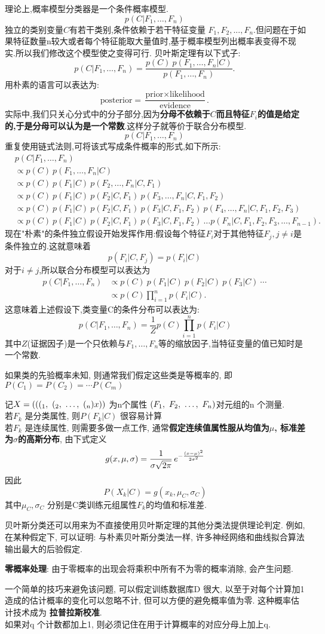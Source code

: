 \documentclass{article}
\begin{document}
理论上,概率模型分类器是一个条件概率模型.
$$ p(C \vert F_1,\dots,F_n)\, $$
独立的类别变量$C$有若干类别,条件依赖于若干特征变量 $F_1,F_2,...,F_n$.但问题在于如果特征数量n较大或者每个特征能取大量值时,基于概率模型列出概率表变得不现实.所以我们修改这个模型使之变得可行. 贝叶斯定理有以下式子:
$$ p(C \vert F_1,\dots,F_n) = \frac{p(C) \ p(F_1,\dots,F_n\vert C)}{p(F_1,\dots,F_n)}. \, $$
用朴素的语言可以表达为:
$$ \mbox{posterior} = \frac{\mbox{prior} \times \mbox{likelihood}}{\mbox{evidence}}.  \, $$
实际中,我们只关心分式中的分子部分,因为\textbf{分母不依赖于$C$而且特征$F_i$的值是给定的,于是分母可以认为是一个常数}.这样分子就等价于联合分布模型.
$$ p(C \vert F_1, \dots, F_n)\, $$
重复使用链式法则,可将该式写成条件概率的形式,如下所示:
$$
\begin{aligned}
& p(C \vert F_1, \dots, F_n)\,\\
& \varpropto p(C) \ p(F_1,\dots,F_n\vert C)\\
& \varpropto p(C) \ p(F_1\vert C) \ p(F_2,\dots,F_n\vert C, F_1)\\
& \varpropto p(C) \ p(F_1\vert C) \ p(F_2\vert C, F_1) \ p(F_3,\dots,F_n\vert C, F_1, F_2)\\
& \varpropto p(C) \ p(F_1\vert C) \ p(F_2\vert C, F_1) \ p(F_3\vert C, F_1, F_2) \ p(F_4,\dots,F_n\vert C, F_1, F_2, F_3)\\
& \varpropto p(C) \ p(F_1\vert C) \ p(F_2\vert C, F_1) \ p(F_3\vert C, F_1, F_2) \ \dots p(F_n\vert C, F_1, F_2, F_3,\dots,F_{n-1}).
\end{aligned}
$$
现在"朴素"的条件独立假设开始发挥作用:假设每个特征$F_i$对于其他特征$F_j,j\neq i$是条件独立的.这就意味着
$$ p(F_i \vert C, F_j) = p(F_i \vert C)\, $$
对于$i\ne j$,所以联合分布模型可以表达为
$$
\begin{aligned}
p(C \vert F_1, \dots, F_n) 
& \varpropto p(C) \ p(F_1\vert C) \ p(F_2\vert C) \ p(F_3\vert C) \ \cdots\, \\
& \varpropto p(C) \prod_{i=1}^n p(F_i \vert C).\,
\end{aligned}
$$
这意味着上述假设下,类变量C的条件分布可以表达为:
$$ p(C \vert F_1,\dots,F_n) = \frac{1}{Z}  p(C) \prod_{i=1}^n p(F_i \vert C) $$
其中$Z$(证据因子)是一个只依赖与$F_1,\dots,F_n$等的缩放因子,当特征变量的值已知时是一个常数.

如果类的先验概率未知, 则通常我们假定这些类是等概率的, 即
$ P(C_1)= P(C_2)= \cdots P(C_m) $

记$X = (((_1,~(_2,~\ldots,~(_n)x))$ 为n个属性 $(F_1,~F_2,~\ldots,~F_n)$对元组的n 个测量.\\
若$F_k$ 是分类属性, 则$P(F_k \vert C)$ 很容易计算\\
若$F_k$ 是连续属性, 则需要多做一点工作, 通常\textbf{假定连续值属性服从均值为$\mu$, 标准差为$\sigma$的高斯分布}, 由下式定义
$$ g(x,\mu, \sigma) = {1 \over \sigma\sqrt{2\pi} }\,e^{- {{(x-\mu )^2 \over 2\sigma^2}}} $$
因此
$$ P(X_k \vert C) = g(x_k, \mu_C, \sigma_C) $$
其中$\mu_C, \sigma_C$ 分别是C类训练元组属性$F_k$的均值和标准差.

贝叶斯分类还可以用来为不直接使用贝叶斯定理的其他分类法提供理论判定. 
例如, 在某种假定下, 可以证明: 与朴素贝叶斯分类法一样, 许多神经网络和曲线拟合算法输出最大的后验假定.

\bigskip
\textbf{零概率处理}: 由于零概率的出现会将乘积中所有不为零的概率消除, 会产生问题.

一个简单的技巧来避免该问题, 可以假定训练数据库D 很大, 以至于对每个计算加1 造成的估计概率的变化可以忽略不计, 但可以方便的避免概率值为零. 这种概率估计技术成为
\textbf{拉普拉斯校准}.\\
如果对q 个计数都加上1, 则必须记住在用于计算概率的对应分母上加上q.
\end{document}
